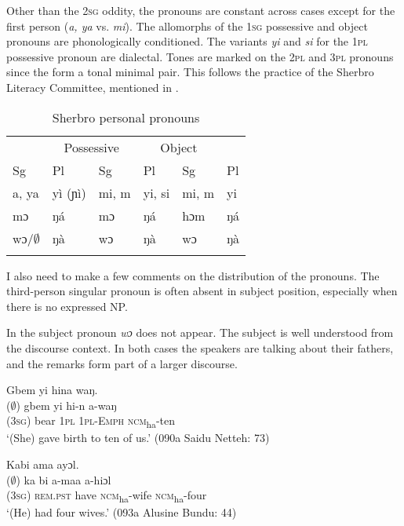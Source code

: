 Other than the \textsc{2sg} oddity, the pronouns are constant across cases except for the first person (\textit{a, ya} vs. \textit{mi}). The allomorphs of the \textsc{1sg} possessive and object pronouns are phonologically conditioned. The variants \textit{yi} and \textit{si} for the \textsc{1pl} possessive pronoun are dialectal. Tones are marked on the \textsc{2pl} and \textsc{3pl} pronouns since the form a tonal minimal pair. This follows the practice of the Sherbro Literacy Committee, mentioned in .

\begin{table}
\caption{Sherbro personal pronouns}
\label{tab:wordcat:14}

\begin{tabularx}{\textwidth}{XXXXXX}
\lsptoprule
\multicolumn{2}{c}{Subject} & \multicolumn{2}{c}{Possessive} & \multicolumn{2}{c}{Object}\\
\cmidrule(lr){1-2}\cmidrule(lr){3-4}\cmidrule(lr){5-6}
Sg & Pl & Sg & Pl & Sg & Pl\\
\midrule
a, ya & y\`{i} (ɲì) & mi, m & yi, si & mi, m & yi\\
mɔ & ŋá & mɔ & ŋá & hɔm & ŋá\\
wɔ/$\emptyset$ & ŋà & wɔ & ŋà & wɔ & ŋà\\
\lspbottomrule
\end{tabularx}
\end{table}

I also need to make a few comments on the distribution of the pronouns. The third-person singular pronoun is often absent in subject position, especially when there is no expressed NP.

In  the subject pronoun \textit{wɔ} does not appear. The subject is well understood from the discourse context. In both cases the speakers are talking about their fathers, and the remarks form part of a larger discourse.

\ea%
    \label{ex:53}
    \ea Gbem yi hina waŋ.\\
    \gll ($\emptyset$)  gbem    yi    hi-n      a-waŋ\\
      (3\textsc{sg})  bear    \textsc{1pl}  \textsc{1pl-Emph}  \textsc{ncm}\textsubscript{ha}{}-ten\\
    \glt ‘(She) gave birth to ten of us.' (090a Saidu Netteh: 73)

    \ex Kabi ama ayɔl.\\
    \gll ($\emptyset$)  ka      bi    a-maa      a-hiɔl\\
    (3\textsc{sg})  \textsc{rem.pst}  have  \textsc{ncm}\textsubscript{ha}\textsc{{}-}wife    \textsc{ncm}\textsubscript{ha}\textsc{{}-}four\\
    \glt ‘(He) had four wives.' (093a Alusine Bundu: 44)
    \z
    \z

